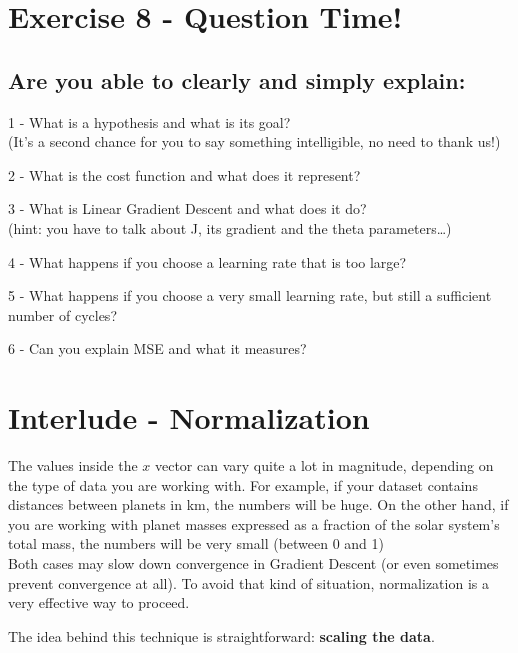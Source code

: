 \documentclass[]{article}
\begin{document}
\clearpage

\hypertarget{exercise-8---question-time}{%
\section{Exercise 8 - Question Time!}\label{exercise-8---question-time}}

\hypertarget{are-you-able-to-clearly-and-simply-explain-1}{%
\subsection{Are you able to clearly and simply
explain:}\label{are-you-able-to-clearly-and-simply-explain-1}}

1 - What is a hypothesis and what is its goal?\\
(It's a second chance for you to say something intelligible, no need to
thank us!)

2 - What is the cost function and what does it represent?

3 - What is Linear Gradient Descent and what does it do?\\
(hint: you have to talk about J, its gradient and the theta
parameters\ldots{})

4 - What happens if you choose a learning rate that is too large?

5 - What happens if you choose a very small learning rate, but still a
sufficient number of cycles?

6 - Can you explain MSE and what it measures? \clearpage

\hypertarget{interlude---normalization-1}{%
\section{Interlude - Normalization}\label{interlude---normalization-1}}

The values inside the \(x\) vector can vary quite a lot in magnitude,
depending on the type of data you are working with. For example, if your
dataset contains distances between planets in km, the numbers will be
huge. On the other hand, if you are working with planet masses expressed
as a fraction of the solar system's total mass, the numbers will be very
small (between 0 and 1)\\
Both cases may slow down convergence in Gradient Descent (or even
sometimes prevent convergence at all). To avoid that kind of situation,
normalization is a very effective way to proceed.

The idea behind this technique is straightforward: \textbf{scaling the
data}.
\end{document}
